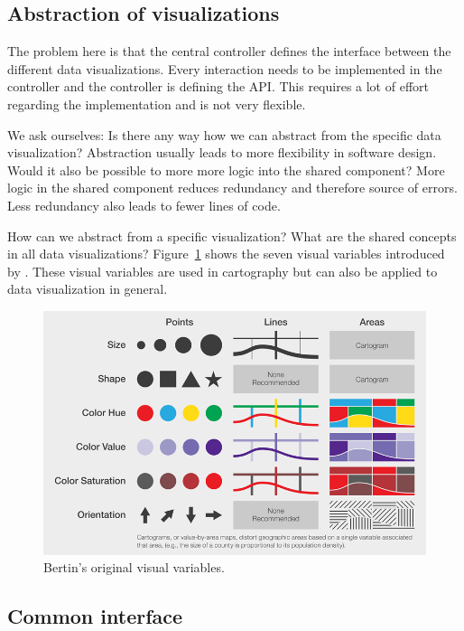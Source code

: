 \documentclass{article}
\begin{document}
\subsection{Abstraction of visualizations}
The problem here is that the central controller defines the interface between the different data visualizations.
Every interaction needs to be implemented in the controller and the controller is defining the API.
This requires a lot of effort regarding the implementation and is not very flexible.

We ask ourselves: Is there any way how we can abstract from the specific data visualization?
Abstraction usually leads to more flexibility in software design.
Would it also be possible to more more logic into the shared component?
More logic in the shared component reduces redundancy and therefore source of errors.
Less redundancy also leads to fewer lines of code.

How can we abstract from a specific visualization?
What are the shared concepts in all data visualizations?
Figure~\ref{fig:concept:visual-variables} shows the seven visual variables introduced by \textcite{Bertin2010}.
These visual variables are used in cartography but can also be applied to data visualization in general.
\begin{figure}[h!]
  \centering
  \includegraphics[width=\textwidth]{images/visual-variables.png}
  \caption{Bertin's\cite{Bertin2010} original visual variables.}
  \label{fig:concept:visual-variables}
\end{figure}

\subsection{Common interface}
\end{document}
